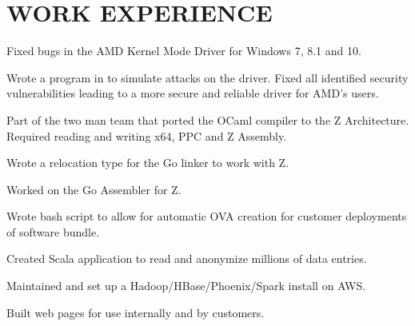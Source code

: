 \documentclass[letterpaper]{deedy-resume-modified} %
\begin{document}
\begin{minipage}[t]{0.66\textwidth} %
\vspace{16pt}

\section{WORK EXPERIENCE}


\vspace{\topsep}
\begin{tightitemize}
\item Fixed bugs in the AMD Kernel Mode Driver for Windows 7, 8.1 and 10.
\item Wrote a program in \CPP  to simulate attacks on the driver.  Fixed all identified security vulnerabilities leading to a more secure and reliable driver for AMD's users.
\end{tightitemize}

\sectionspace %


\begin{tightitemize}
\item Part of the two man team that ported the OCaml compiler to the Z Architecture. Required reading and writing x64, PPC and Z Assembly.
\item Wrote a relocation type for the Go linker to work with Z.
\item Worked on the Go Assembler for Z.
\end{tightitemize}

\sectionspace %



\begin{tightitemize}
\item Wrote bash script to allow for automatic OVA creation for customer deployments of software bundle.
\item Created Scala application to read and anonymize millions of data entries.
\item Maintained and set up a Hadoop/HBase/Phoenix/Spark install on AWS.
\item Built web pages for use internally and by customers.
\end{tightitemize}


\end{minipage}
\end{document}
